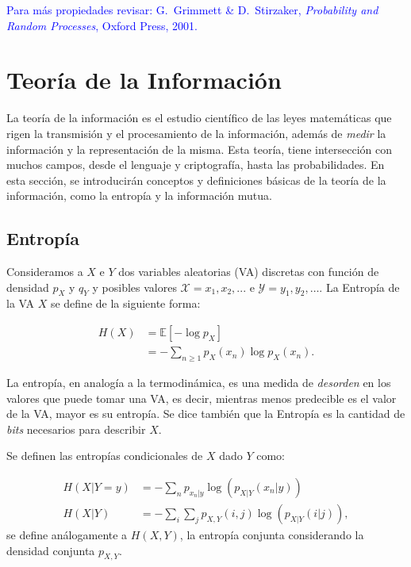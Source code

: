 \textcolor{blue}{Para más propiedades revisar: G.~Grimmett \& D.~Stirzaker, \emph{Probability and Random Processes}, Oxford Press, 2001.}


 


\section{Teoría de la Información}

La teoría de la información es el estudio científico de las leyes matemáticas que rigen la transmisión y el procesamiento de la información, además de \emph{medir} la información y la representación de la misma. Esta teoría, tiene intersección con muchos campos, desde el lenguaje y criptografía, hasta las probabilidades. En esta sección, se introducirán conceptos y definiciones básicas de la teoría de la información, como la entropía y la información mutua. 


\subsection{Entropía}

Consideramos a $X$ e $Y$ dos variables aleatorias (VA) discretas con función de densidad $p_X$ y $q_Y$ y posibles valores $\mathcal{X}=x_1,x_2,...$ e $\mathcal{Y}=y_1,y_2,\ldots$. La Entropía de la VA $X$ se define de la siguiente forma:

\begin{align*}
    H(X)&=\mathbb{E}[-\log p_X]\\
    &=-\sum\limits_{n\geq 1}p_X(x_n)\log p_X(x_n).
\end{align*}

La entropía, en analogía a la termodinámica, es una medida de \emph{desorden} en los valores que puede tomar una VA, es decir, mientras menos predecible es el valor de la VA, mayor es su entropía. Se dice también que la Entropía es la cantidad de \emph{bits} necesarios para describir $X$. 

Se definen las entropías condicionales de $X$ dado $Y$ como:

\begin{align*}
    H(X|Y=y)&=-\sum\limits_{n}p_{x_n|y}\log (p_{X|Y}(x_n|y))\\
    H(X|Y)&=-\sum\limits_i\sum\limits_j p_{X,Y}(i,j)\log (p_{X|Y}(i|j)),
\end{align*}
se define análogamente a $H(X,Y)$, la entropía conjunta considerando la densidad conjunta $p_{X,Y}$.

